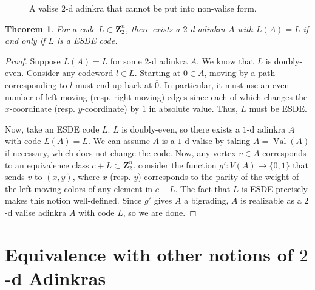 \documentclass[12pt,twoside,singlespace]{article}
\numberwithin{equation}{section}
\newtheorem{thm}[equation]{Theorem}
\theoremstyle{definition}
\newcommand{\ZZ}{\mathbf{Z}}
\newcommand{\on}{\operatorname}
\newcommand{\val}{\on{Val}}
\begin{document}
\begin{figure}[htb]
\begin{center}

\caption{A valise $2$-d adinkra that cannot be put into non-valise form.\label{fig:tight valise}}
\end{center}
\end{figure}

\begin{thm}
\label{thm:esde}
For a code $L \subset \ZZ_2^n$, there exists a $2$-d adinkra $A$ with $L(A) = L$ if and only if $L$ is a ESDE code.
\end{thm}
\begin{proof}
Suppose $L(A) = L$ for some $2$-d adinkra $A$. We know that $L$ is doubly-even. Consider any codeword $l \in L$. Starting at $\overline{0} \in A$, moving by a path corresponding to $l$ must end up back at $\overline{0}$. In particular, it must use an even number of left-moving (resp. right-moving) edges since each of which changes the $x$-coordinate (resp. $y$-coordinate) by $1$ in absolute value. Thus, $L$ must be ESDE.

Now, take an ESDE code $L$. $L$ is doubly-even, so there exists a $1$-d adinkra $A$ with code $L(A) = L$. We can assume $A$ is a $1$-d valise by taking $A = \val(A)$ if necessary, which does not change the code. Now, any vertex $v \in A$ corresponds to an equivalence class $c+L \subset \ZZ_2^n.$ consider the function $g'\colon V(A) \rightarrow \{0,1\}$ that sends $v$ to $(x,y)$, where $x$ (resp. $y$) corresponds to the parity of the weight of the left-moving colors of any element in $c+L$. The fact that $L$ is ESDE precisely makes this notion well-defined. Since $g'$ gives $A$ a bigrading, $A$ is realizable as a $2$-d valise adinkra $A$ with code $L$, so we are done. 
\end{proof}


\appendix
\section{Equivalence with other notions of $2$-d Adinkras}
\end{document}
